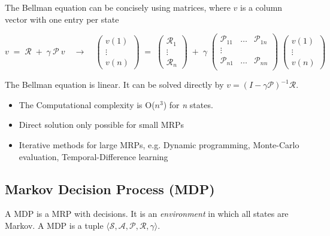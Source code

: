 \documentclass[10pt]{article}
\begin{document}
The Bellman  equation can be concisely using matrices, where $v$ is a column vector with one entry per state

\begin{equation}
v \; = \; \mathcal{R} \; + \; \gamma \: \mathcal{P} \: v \quad \rightarrow \quad
\begin{pmatrix}
v(1) \\ \vdots \\ v(n) \end{pmatrix} \; = \; \begin{pmatrix}
\mathcal{R}_{1} \\ \vdots \\ \mathcal{R}_{n} \end{pmatrix} \; + \; \gamma \; \begin{pmatrix}
\mathcal{P}_{11} & \ldots & \mathcal{P}_{1n} \\
\vdots & & \\
\mathcal{P}_{n1} & \ldots & \mathcal{P}_{nn} \\ \end{pmatrix} \; \begin{pmatrix}
v(1) \\ \vdots \\ v(n) \end{pmatrix} \label{eq:mrp_matrix}
\end{equation} 

The Bellman equation is linear. It can be solved directly by $v = (I - \gamma \mathcal{P})^{-1} \mathcal{R}$.

\begin{itemize}
\item The Computational complexity is O($n^{3}$) for \textit{n} states.
\item Direct solution only possible for small MRPs
\item Iterative methods for large MRPs, e.g. Dynamic programming, Monte-Carlo evaluation, Temporal-Difference learning
\end{itemize}

\subsection{Markov Decision Process (MDP)}
A MDP is a MRP with decisions. It is an \textit{environment} in which all states are Markov. \newline
A MDP is a tuple $\langle \mathcal{S, A, P, R,} \gamma \rangle$.
\end{document}
